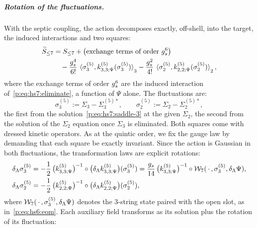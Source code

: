 \subparagraph{Rotation of the fluctuations.}

With the septic coupling, the action decomposes exactly, off-shell, into the target, the induced interactions and two squares:
\begin{equation}
  \label{p:eq:hs7:identity}
  \begin{aligned}
    \caction[\le 7]
      &
      = S_{\le 7}
        + \big( \text{exchange terms of order } \gs^6 \big)
      \\ &
      \quad
      - \frac{\gs^4}{6!} \, \pair[3]{\sigma_3^{(5)}}{\kin{3}{\Psi}{5}(\sigma_3^{(5)})}
      - \frac{\gs^2}{4!} \, \pair[2]{\sigma_2^{(5)}}{\kin{2}{\Psi}{5}(\sigma_2^{(5)})},
  \end{aligned}
\end{equation}
where the exchange terms of order $g_s^6$ are the induced interaction of~\eqref{p:eq:hs7:eliminate}, a function of $\Psi$ alone.
The fluctuations are:
\begin{equation}
  \label{p:eq:hs7:deviations}
  \sigma_3^{(5)}
    := \Sigma_3 - \Sigma_3^{(5)*},
  \qquad
  \sigma_2^{(5)}
    := \Sigma_2 - \Sigma_2^{(5)*},
\end{equation}
the first from the solution~\eqref{p:eq:hs7:saddle-3} at the given $\Sigma_2$, the second from the solution of the $\Sigma_2$ equation once $\Sigma_3$ is eliminated.
Both squares come with dressed kinetic operators.
As at the quintic order, we fix the gauge law by demanding that each square be exactly invariant.
Since the action is Gaussian in both fluctuations, the transformation laws are explicit rotations:
\begin{equation}
  \label{p:eq:hs7:gauge-deviations}
  \begin{aligned}
    \delta_\Lambda \sigma_3^{(5)}
      &
      = - \frac{1}{2} \, \big( \kin{3}{\Psi}{5} \big)^{-1} \circ \big( \delta_\Lambda \kin{3}{\Psi}{5} \big) (\sigma_3^{(5)})
      = \frac{\gs}{14} \, \big( \kin{3}{\Psi}{5} \big)^{-1} \circ \dvertex{7}(\, \cdot \,, \sigma_3^{(5)}, \delta_\Lambda \Psi),
    \\
    \delta_\Lambda \sigma_2^{(5)}
      &
      = - \frac{1}{2} \, \big( \kin{2}{\Psi}{5} \big)^{-1} \circ \big( \delta_\Lambda \kin{2}{\Psi}{5} \big) (\sigma_2^{(5)}),
  \end{aligned}
\end{equation}
where $\mathcal{W}_{7}(\, \cdot \,, \sigma_3^{(5)}, \delta_\Lambda \Psi)$ denotes the $3$-string state paired with the open slot, as in~\eqref{p:eq:hs6:eom}.
Each auxiliary field transforms as its solution plus the rotation of its fluctuation:
